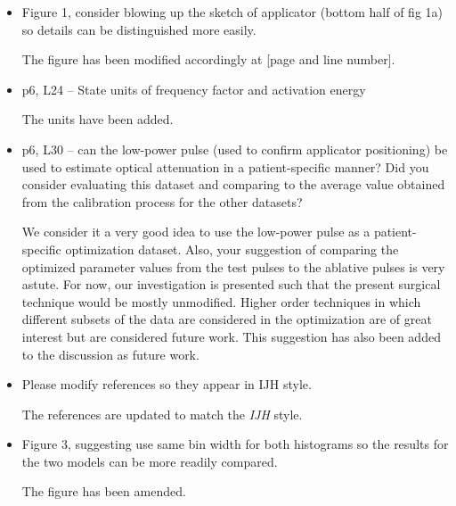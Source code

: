 \documentclass[letterpaper,12pt]{report}
\begin{document}
\begin{itemize}
{}


\item
 Figure 1, consider blowing up the sketch of applicator (bottom half of fig 1a) so details can be distinguished more easily.

{\color{red}
The figure has been modified accordingly at
{\color{green}[page and line number]}. 
}

\item
p6, L24 -- State units of frequency factor and activation energy

{\color{red}
The units have been added.
}

\item
p6, L30 -- can the low-power pulse (used to confirm applicator positioning) be used to estimate optical
attenuation in a patient-specific manner? Did you consider evaluating this dataset and comparing to the
average value obtained from the calibration process for the other datasets?

{\color{red}
We consider it a very good idea to use the low-power pulse as a patient-specific optimization dataset. Also,
your suggestion of comparing the optimized parameter values from the test pulses to the ablative pulses is
very astute. For now, 
our investigation is presented such that the present surgical
technique would be mostly unmodified. Higher order techniques in which
different subsets of the data are considered in the optimization are of
great interest but are considered future work. 
This suggestion has also been added to the discussion as future work.

}
\item
Please modify references so they appear in IJH style.

{\color{red}
The references are updated to match the \textit{IJH} style.
}\\
\item
Figure 3, suggesting use same bin width for both histograms so the results for the two models can be
more readily compared.

{\color{red}
The figure has been amended.
}
\end{itemize}
\end{document}
